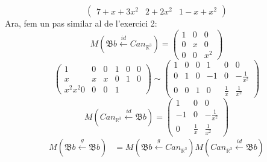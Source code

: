 \documentclass[a4paper, 12pt]{article}
\begin{document}
\begin{solucio}
\begin{displaymath}
            \left(
                \begin{array}{ccc}
                    7+x+3x^2 & 2+2x^2 & 1-x+x^2
                \end{array}
            \right)
        \end{displaymath}
        Ara, fem un pas similar al de l'exercici 2:
        \begin{displaymath}
            M(\mathfrak{B}b \xleftarrow{id} Can_{\mathbb{R}^3}) = \left(
                \begin{array}{c|c|c}
                    1 & 0 & 0\\
                    0 & x & 0\\
                    0 & 0 & x^2
                \end{array}
            \right)
        \end{displaymath}
        \begin{displaymath}
            \left(
                \begin{array}{ccc|ccc}
                    1 & 0 & 0 & 1 & 0 & 0\\
                    x & x & x & 0 & 1 & 0\\
                    x^2 x^2 0 & 0 & 0 & 1
                \end{array}
            \right)
            \sim
            \left(
                \begin{array}{ccc|ccc}
                    1 & 0 & 0 & 1 & 0 & 0\\
                    0 & 1 & 0 & -1 & 0 & -\frac{1}{x^2}\\
                    0 & 0 & 1 & 0 & \frac{1}{x} & \frac{1}{x^2}
                \end{array}
            \right)
        \end{displaymath}
        \begin{displaymath}
            M(Can_{\mathbb{R}^3} \xleftarrow{id} \mathfrak{B}b) = 
            \left(
                \begin{array}{ccc}
                    1 & 0 & 0\\
                    -1 & 0 & -\frac{1}{x^2}\\
                    0 & \frac{1}{x} & \frac{1}{x^2}
                \end{array}
            \right)
        \end{displaymath}
        \begin{align*}
            M(\mathfrak{B}b \xleftarrow{g} \mathfrak{B}b) &= M(\mathfrak{B}b \xleftarrow{g} Can_{\mathbb{R}^3}) M(Can_{\mathbb{R}^3} \xleftarrow{id} \mathfrak{B}b)\\

\end{align*}
\end{solucio}
\end{document}

